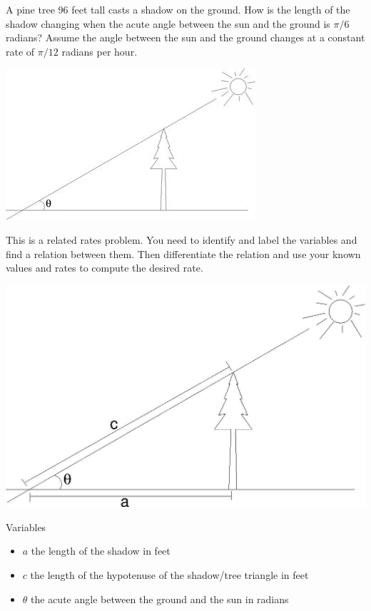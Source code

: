 \documentclass{ximera}
\author{Emma Smith Zbarsky}
\begin{document}
\begin{exercise}

A pine tree 96 feet tall casts a shadow on the ground. How is the length
of the shadow changing when the acute angle between the sun and the
ground is $\pi/6$ radians? Assume the angle between the sun and the
ground changes at a constant rate of $\pi/12$ radians per hour.



\begin{image}\includegraphics[width=.5\textwidth]{relatedrates-tree.jpg}\end{image}


\begin{hint}
This is a related rates problem. You need to identify and label the
variables and find a relation between them. Then differentiate the
relation and use your known values and rates to compute the desired
rate.
\end{hint}


\begin{hint}
\begin{image}\includegraphics[width=.5\textwidth]{rr-tree-labeled.jpg}\end{image}



Variables

\begin{itemize}
\item
  $a$ the length of the shadow in feet
\item
  $c$ the length of the hypotenuse of the shadow/tree triangle in feet
\item
  $\theta$ the acute angle between the ground and the sun in radians
\end{itemize}


\end{hint}
\end{exercise}
\end{document}
